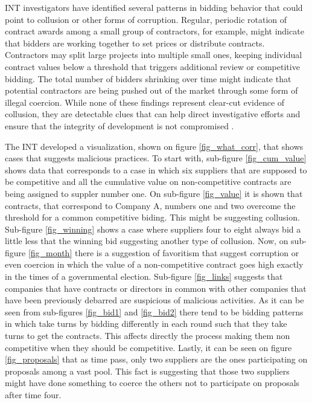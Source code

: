 INT investigators have identified several patterns in bidding behavior that could point to collusion or other forms of corruption. Regular, periodic rotation of contract awards among a small group of contractors, for example, might indicate that bidders are working together to set prices or distribute contracts. Contractors may split large projects into multiple small ones, keeping individual contract values below a threshold that triggers additional review or competitive bidding. The total number of bidders shrinking over time might indicate that potential contractors are being pushed out of the market through some form of illegal coercion. While none of these findings represent clear-cut evidence of collusion, they are detectable clues that can help direct investigative efforts and ensure that the integrity of development is not compromised \parencite{dssg_proc}.

The INT developed a visualization, shown on figure \ref{fig_what_corr}, that shows cases that suggests malicious practices. To start with, sub-figure \ref{fig_cum_value} shows data that corresponds to a case in which  six suppliers that are supposed to be competitive and all the cumulative value on non-competitive contracts are being assigned to suppler number one. On sub-figure \ref{fig_value} it is shown that contracts, that correspond to Company A, numbers one and two overcome the threshold for a common competitive biding. This might be suggesting collusion. Sub-figure \ref{fig_winning} shows a case where suppliers four to eight always bid a little less that the winning bid suggesting another type of collusion. Now, on sub-figure \ref{fig_month} there is a suggestion of favoritism that suggest corruption or even coercion in which the value of a non-competitive contract goes high exactly in the times of a governmental election. Sub-figure \ref{fig_links} suggests that companies that have contracts or directors in common with other companies that have been previously debarred are suspicious of malicious activities. As it can be seen from sub-figures 
\ref{fig_bid1} and \ref{fig_bid2} there tend to be bidding patterns in which take turns by bidding differently in each round such that they take turns to get the contracts. This affects directly the process making them non competitive when they should be competitive. Lastly, it can be seen on figure \ref{fig_proposals} that as time pass, only two suppliers are the ones participating on proposals among a vast pool. This  fact is suggesting that those two suppliers might have done something  to coerce the others not to participate on proposals after time four.

